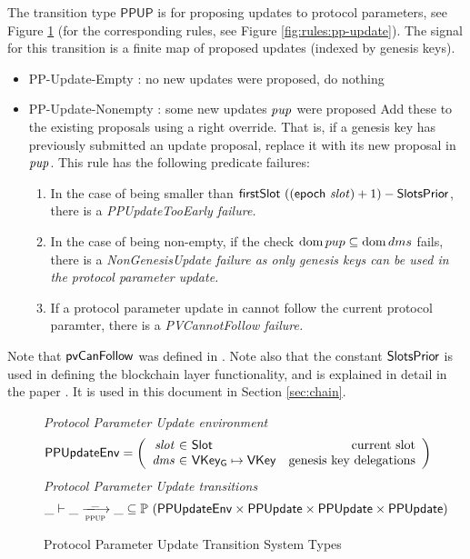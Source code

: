 The transition type $\mathsf{PPUP}$ is for proposing updates to protocol
parameters, see Figure \ref{fig:ts-types:pp-update} (for the corresponding rules,
see Figure \ref{fig:rules:pp-update}).
The signal for this transition is a finite map of proposed updates (indexed by
genesis keys).

\begin{itemize}
  \item PP-Update-Empty : no new updates were proposed, do nothing
  \item PP-Update-Nonempty : some new updates $\mathit{pup}$ were proposed
  Add these to
  the existing proposals using a right override. That is, if a genesis key
  has previously submitted an update proposal, replace it with its new
  proposal in $\mathit{pup}$. This rule has the following predicate failures:

  \begin{enumerate}
  \item In the case of  being smaller than
    $\mathsf{firstSlot}~((\mathsf{epoch}~\mathit{slot}) + 1) - \mathsf{SlotsPrior}$, there is
    a \em{PPUpdateTooEarly} failure.
  \item In the case of  being non-empty, if the check $\operatorname{dom} pup \subseteq
    \operatorname{dom} dms$ fails, there is a \em{NonGenesisUpdate} failure as only genesis keys
    can be used in the protocol parameter update.
  \item If a protocol parameter update in  cannot follow the current
    protocol paramter, there is a \em{PVCannotFollow} failure.
  \end{enumerate}
\end{itemize}

Note that $\mathsf{pvCanFollow}$
was defined in \cite{byron_ledger_spec}. Note also that the constant $\mathsf{SlotsPrior}$
is used in defining the blockchain layer functionality,
and is explained in detail in the paper \cite{ouroboros_praos}. It is used in this document in
Section \ref{sec:chain}.


\begin{figure}[htb]
  \emph{Protocol Parameter Update environment}
  \begin{equation*}
    \PPUpdateEnv =
    \left(
      \begin{array}{r@{~\in~}lr}
        \var{slot} & \Slot & \text{current slot}\\
        \var{dms} & \VKeyGen\mapsto\VKey & \text{genesis key delegations} \\
      \end{array}
    \right)
  \end{equation*}
  \emph{Protocol Parameter Update transitions}
  \begin{equation*}
    \_ \vdash
    \var{\_} \trans{ppup}{\_} \var{\_}
    \subseteq \powerset (\PPUpdateEnv \times \PPUpdate \times \PPUpdate \times \PPUpdate)
  \end{equation*}
  \caption{Protocol Parameter Update Transition System Types}
  \label{fig:ts-types:pp-update}
\end{figure}


